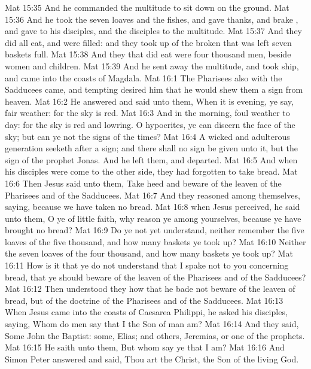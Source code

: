\vs Mat 15:35 And he commanded the multitude to sit down on the ground.
\vs Mat 15:36 And he took the seven loaves and the fishes, and gave thanks, and brake , and gave to his disciples, and the disciples to the multitude.
\vs Mat 15:37 And they did all eat, and were filled: and they took up of the broken  that was left seven baskets full.
\vs Mat 15:38 And they that did eat were four thousand men, beside women and children.
\vs Mat 15:39 And he sent away the multitude, and took ship, and came into the coasts of Magdala.
\vs Mat 16:1 The Pharisees also with the Sadducees came, and tempting desired him that he would shew them a sign from heaven.
\vs Mat 16:2 He answered and said unto them, When it is evening, ye say,  fair weather: for the sky is red.
\vs Mat 16:3 And in the morning,  foul weather to day: for the sky is red and lowring. O  hypocrites, ye can discern the face of the sky; but can ye not  the signs of the times?
\vs Mat 16:4 A wicked and adulterous generation seeketh after a sign; and there shall no sign be given unto it, but the sign of the prophet Jonas. And he left them, and departed.
\vs Mat 16:5 And when his disciples were come to the other side, they had forgotten to take bread.
\vs Mat 16:6 Then Jesus said unto them, Take heed and beware of the leaven of the Pharisees and of the Sadducees.
\vs Mat 16:7 And they reasoned among themselves, saying,  because we have taken no bread.
\vs Mat 16:8  when Jesus perceived, he said unto them, O ye of little faith, why reason ye among yourselves, because ye have brought no bread?
\vs Mat 16:9 Do ye not yet understand, neither remember the five loaves of the five thousand, and how many baskets ye took up?
\vs Mat 16:10 Neither the seven loaves of the four thousand, and how many baskets ye took up?
\vs Mat 16:11 How is it that ye do not understand that I spake  not to you concerning bread, that ye should beware of the leaven of the Pharisees and of the Sadducees?
\vs Mat 16:12 Then understood they how that he bade  not beware of the leaven of bread, but of the doctrine of the Pharisees and of the Sadducees.
\vs Mat 16:13 When Jesus came into the coasts of Caesarea Philippi, he asked his disciples, saying, Whom do men say that I the Son of man am?
\vs Mat 16:14 And they said, Some  John the Baptist: some, Elias; and others, Jeremias, or one of the prophets.
\vs Mat 16:15 He saith unto them, But whom say ye that I am?
\vs Mat 16:16 And Simon Peter answered and said, Thou art the Christ, the Son of the living God.
